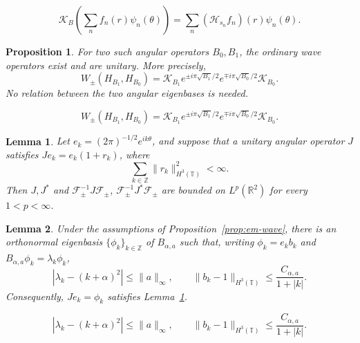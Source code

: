\documentclass[10pt,a4paper]{amsart}
\newtheorem{proposition}{Proposition}
\newtheorem{lemma}{Lemma}
\newcommand{\HH}{\mathcal H}                 %
\newcommand{\R}{\mathbb R}
\newcommand{\T}{\mathbb T}
\newcommand{\Z}{\mathbb Z}
\begin{document}
\begin{equation}\label{eq:em-K}
  \mathcal K_B\left(\sum_n f_n(r)\psi_n(\theta)\right)
  =\sum_n(\HH_{s_n}f_n)(r)\psi_n(\theta).
\end{equation}

\begin{proposition}\label{prop:em-L2}
  For two such angular operators $B_0,B_1$, the ordinary
  wave operators exist and are unitary. More precisely,
  \begin{equation}\label{eq:em-L2}
    W_\pm(H_{B_1},H_{B_0})
    =\mathcal K_{B_1}e^{\pm i\pi\sqrt{B_1}/2}
    e^{\mp i\pi\sqrt{B_0}/2}\mathcal K_{B_0}.
  \end{equation}
  No relation between the two angular eigenbases is needed.
\end{proposition}

  \begin{equation}
    W_\pm(H_{B_1},H_{B_0})
    =\mathcal K_{B_1}e^{\pm i\pi\sqrt{B_1}/2}
    e^{\mp i\pi\sqrt{B_0}/2}\mathcal K_{B_0}.
  \end{equation}

\begin{lemma}\label{lem:em-angular}
  Let $e_k=(2\pi)^{-1/2}e^{ik\theta}$, and suppose that a
  unitary angular operator $J$ satisfies
  $Je_k=e_k(1+r_k)$, where
  \begin{equation}\label{eq:em-summability}
    \sum_{k\in\Z}\|r_k\|_{H^3(\T)}^2<\infty.
  \end{equation}
  Then $J,J^*$ and
  $\mathcal F_\pm^{-1}J\mathcal F_\pm$,
  $\mathcal F_\pm^{-1}J^*\mathcal F_\pm$ are bounded on
  $L^p(\R^2)$ for every $1<p<\infty$.
\end{lemma}

\begin{lemma}\label{lem:em-eigenbasis}
  Under the assumptions of Proposition~\ref{prop:em-wave}, there
  is an orthonormal eigenbasis $\{\phi_k\}_{k\in\Z}$ of
  $B_{\alpha,a}$ such that, writing
  $\phi_k=e_k b_k$ and $B_{\alpha,a}\phi_k=\lambda_k\phi_k$,
  \begin{equation}\label{eq:em-basis-estimate}
    |\lambda_k-(k+\alpha)^2|\le\|a\|_\infty,
    \qquad
    \|b_k-1\|_{H^3(\T)}
    \le\frac{C_{\alpha,a}}{1+|k|}.
  \end{equation}
  Consequently, $Je_k=\phi_k$ satisfies
  Lemma~\ref{lem:em-angular}.
\end{lemma}

  \begin{equation}
    |\lambda_k-(k+\alpha)^2|\le\|a\|_\infty,
    \qquad
    \|b_k-1\|_{H^3(\T)}
    \le\frac{C_{\alpha,a}}{1+|k|}.
  \end{equation}
\end{document}
